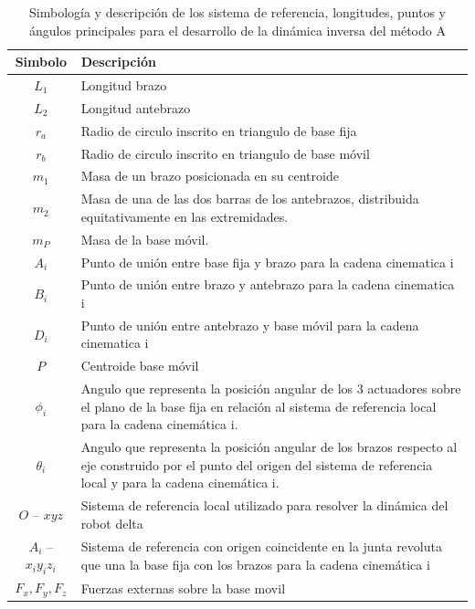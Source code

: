            \begin{table}[h]
            \centering
            \renewcommand{\arraystretch}{1.41}
                \begin{tabular}{c m{11cm}}
            \hline
                \textbf{Simbolo}& \textbf{Descripción} \\ 
            \hline             \hline
             $L_{1}$ &  Longitud brazo\\
            \hline
             $L_{2}$ & Longitud antebrazo \\
            \hline
            $ r_{a}$ &  Radio de circulo inscrito en triangulo de base fija\\
            \hline
             $r_{b}$ & Radio de circulo inscrito en triangulo de base móvil \\
            \hline
            $m_{1}$ & Masa de un brazo posicionada en su centroide \\
            \hline
             $m_{2}$ & Masa de una de las dos barras de los antebrazos, distribuida equitativamente en las extremidades. \\
            \hline
             $m_{P}$ & Masa de la base móvil. \\
            \hline
             $A_{i}$ & Punto de unión entre base fija y brazo para la cadena cinematica i \\
            \hline
             $B_{i}$ & Punto de unión entre brazo y antebrazo para la cadena cinematica i \\
            \hline
             $D_{i}$ & Punto de unión entre antebrazo y base móvil para la cadena cinematica i \\
            \hline
             $P$ & Centroide base móvil\\
            \hline
             $\phi _{i}$ & Angulo que representa la posición angular de los 3 actuadores sobre el plano de la base fija en relación al sistema de referencia  local para la cadena cinemática i. \\
            \hline
             $\theta _{i}$ & Angulo que representa la posición angular de los brazos respecto al eje construido por el punto del origen del sistema de referencia local  y  para la cadena cinemática i.\\
            \hline
             $O$ – $xyz$ & Sistema de referencia local utilizado para resolver la dinámica del robot delta \\
            \hline
            $A_{i}$ – $x_{i}y_{i}z_{i}$ & Sistema de referencia con origen coincidente en la junta revoluta que una la base fija con los brazos para la cadena cinemática i \\
            \hline
             $F_{x},F_{y},F_{z}$ & Fuerzas externas sobre la base movil\\
            \hline
            \end{tabular}
           \caption{Simbología y descripción de los sistema de referencia, longitudes, puntos y ángulos principales para el desarrollo de la dinámica inversa del método A}
           \label{tab:cap4_tabla_dina_ma_2}
        \end{table}
   


